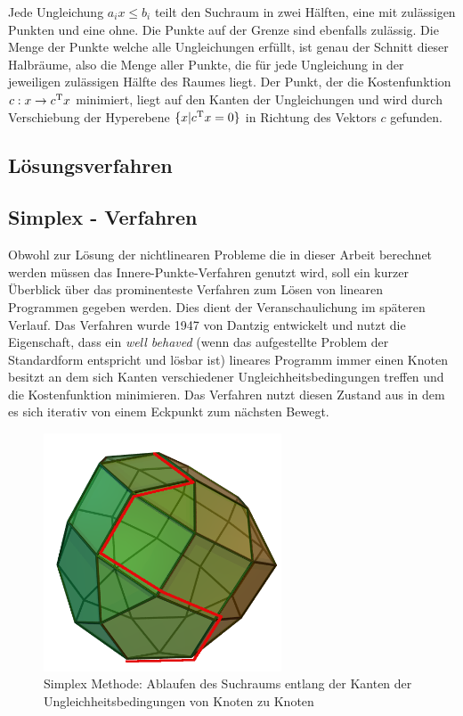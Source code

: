 \documentclass{like}
\begin{document}
Jede Ungleichung $a_i x \leq b_i$ teilt den Suchraum in zwei Hälften, eine mit zulässigen Punkten und eine ohne. Die Punkte auf der Grenze sind ebenfalls zulässig. Die Menge der Punkte welche alle Ungleichungen erfüllt, ist genau der Schnitt dieser Halbräume, also die Menge aller Punkte, die für jede Ungleichung in der jeweiligen zulässigen Hälfte des Raumes liegt. 
Der Punkt, der die Kostenfunktion $c: x \rightarrow c\textsuperscript{T} x$ minimiert, liegt auf den Kanten der Ungleichungen und wird durch Verschiebung der Hyperebene $ \{x| c\textsuperscript{T} x = 0 \}$ in Richtung des Vektors \(c\) gefunden. 


\subsection*{Lösungsverfahren}

\subsection{Simplex - Verfahren}
Obwohl zur Lösung der nichtlinearen Probleme die in dieser Arbeit berechnet werden müssen das Innere-Punkte-Verfahren genutzt wird, soll ein kurzer Überblick über das prominenteste Verfahren zum Lösen von linearen Programmen gegeben werden. Dies dient der Veranschaulichung im späteren Verlauf. Das Verfahren wurde 1947 von Dantzig \cite{dantzig51} entwickelt und nutzt die Eigenschaft, dass ein \textit{well behaved} (wenn das aufgestellte Problem der Standardform entspricht und lösbar ist) lineares Programm immer einen Knoten besitzt an dem sich Kanten verschiedener Ungleichheitsbedingungen treffen und die Kostenfunktion minimieren. Das Verfahren nutzt diesen Zustand aus in dem es sich iterativ von einem Eckpunkt zum nächsten Bewegt. 
\begin{figure}[ht!]
	\centering
	\includegraphics[width=200pt]{Abbildungen/simplexMethod.png}
	\caption{Simplex Methode: Ablaufen des Suchraums entlang der Kanten der Ungleichheitsbedingungen von Knoten zu Knoten}
	\label{fig:splxMethod}
\end{figure}
\end{document}
